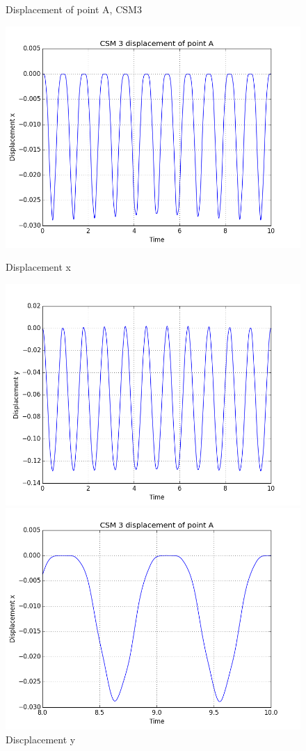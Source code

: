 \begin{figure}[H]  \label{CSM3_plots} 
  \caption {Displacement of point A, CSM3}
  \begin{minipage}[b]{0.5\linewidth}
    \centering
    \includegraphics[width=.75\linewidth]{./Verification_Validation//Hron_Turek/dis_x.png} 
    \caption{Displacement x} 
    \vspace{4ex}
  \end{minipage}%
  \begin{minipage}[b]{0.5\linewidth}
    \centering
    \includegraphics[width=.75\linewidth]{./Verification_Validation//Hron_Turek/dis_y.png} 
    \caption{Discplacement y} 
    \vspace{4ex}
  \end{minipage} 
  \begin{minipage}[b]{0.5\linewidth}
    \centering
    \includegraphics[width=.75\linewidth]{./Verification_Validation//Hron_Turek/dis_x_short.png} 

\end{minipage}
\end{figure}
